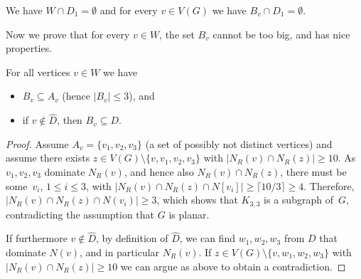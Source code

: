 \begin{lemma}\label{lem:WcapD1}
  We have $W\cap D_1=\emptyset$ and for every $v\in V(G)$ we have
  $B_v\cap D_1=\emptyset$.
\end{lemma}

Now we prove that for every $v\in W$, the set $B_v$ cannot be too big,
and has nice properties.
\begin{lemma}\label{lem:dominating-dominators}
  For all vertices $v\in W$ we have

  \vspace{-5pt}
  \begin{itemize}
  \item $B_v \subseteq A_v$ (hence $|B_v|\le 3$), and \smallskip
  \item if $v\not\in \hat{D}$, then $B_v\subseteq D$.
  \end{itemize}
\end{lemma}

\begin{proof}
  Assume $A_v=\{v_1,v_2,v_3\}$ (a set of possibly not distinct
  vertices) and assume there exists
  $z\in V(G)\setminus \{v,v_1,v_2, v_3\}$ with
  $|N_R(v) \cap N_R(z)| \geq 10$.  As $v_1, v_2, v_3$ dominate $N_R(v)$,
  and hence also \mbox{$N_R(v)\cap N_R(z)$}, there must be some~$v_i$,
  $1\leq i\leq 3$, with
  \mbox{$|N_R(v) \cap N_R(z) \cap N[v_i]| \geq \lceil 10/3\rceil \geq
    4$}.  Therefore, \mbox{$|N_R(v) \cap N_R(z) \cap N(v_i)| \geq 3$},
  which shows that $K_{3,3}$ is a subgraph of~$G$, contradicting the
  assumption that $G$ is planar.

  If furthermore $v\not\in \hat{D}$, by definition of $\hat{D}$, we
  can find $w_1,w_2, w_3$ from $D$ that dominate $N(v)$, and in
  particular $N_R(v)$.  If $z\in V(G)\setminus \{v,w_1,w_2, w_3\}$
  with $|N_R(v) \cap N_R(z)| \geq 10$ we can argue as above to obtain
  a contradiction.
\end{proof}

%

